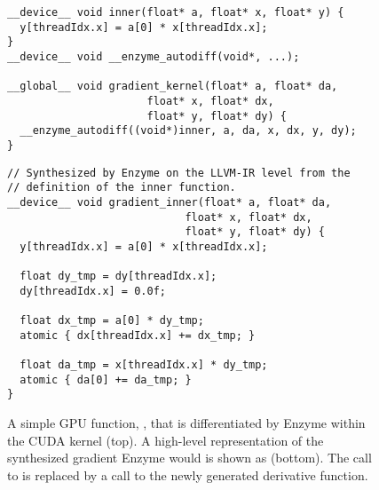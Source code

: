 \begin{figure}
    \centering
\begin{minipage}[T]{0.95\linewidth}
\begin{verbatim}
__device__ void inner(float* a, float* x, float* y) {
  y[threadIdx.x] = a[0] * x[threadIdx.x];
}
__device__ void __enzyme_autodiff(void*, ...);

__global__ void gradient_kernel(float* a, float* da,
                      float* x, float* dx,
                      float* y, float* dy) {
  __enzyme_autodiff((void*)inner, a, da, x, dx, y, dy);
}
\end{verbatim}
\end{minipage}

\bigskip
\bigskip

\begin{minipage}[T]{0.95\linewidth}
\begin{verbatim}
// Synthesized by Enzyme on the LLVM-IR level from the
// definition of the inner function.
__device__ void gradient_inner(float* a, float* da,
                            float* x, float* dx,
                            float* y, float* dy) {
  y[threadIdx.x] = a[0] * x[threadIdx.x];

  float dy_tmp = dy[threadIdx.x];
  dy[threadIdx.x] = 0.0f;

  float dx_tmp = a[0] * dy_tmp;
  atomic { dx[threadIdx.x] += dx_tmp; }

  float da_tmp = x[threadIdx.x] * dy_tmp;
  atomic { da[0] += da_tmp; }
}
\end{verbatim}
\end{minipage}
    \vspace*{-1mm}
    \caption{A simple GPU function, , that is differentiated by Enzyme within the CUDA kernel  (top). 
    A high-level representation of the synthesized gradient Enzyme would  is shown as   (bottom).
    The call to  is replaced by a call to the newly generated derivative function.}
    \label{fig:exdiff}
    \vspace*{-3mm}
\end{figure}

